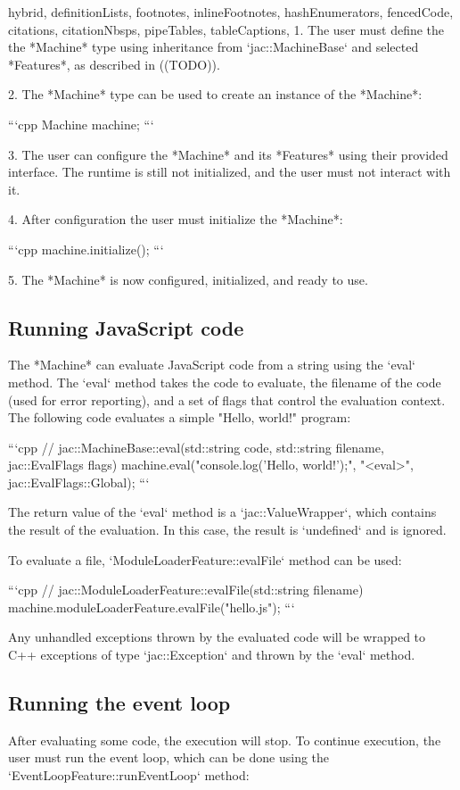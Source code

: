\documentclass[
  digital,
  oneside,
  nosansbold,
  nocolorbold,
  lof,
  lot
]{fithesis4}
\begin{document}
\begin{markdown*}{%
  hybrid,
  definitionLists,
  footnotes,
  inlineFootnotes,
  hashEnumerators,
  fencedCode,
  citations,
  citationNbsps,
  pipeTables,
  tableCaptions,
}
 1. The user must define the the *Machine* type using inheritance from `jac::MachineBase` and selected *Features*, as described in ((TODO)).

 2. The *Machine* type can be used to create an instance of the *Machine*:

```cpp
Machine machine;
```

 3. The user can configure the *Machine* and its *Features* using their provided interface. The runtime is still not initialized, and the user must not interact with it.

 4. After configuration the user must initialize the *Machine*:

```cpp
machine.initialize();
```

 5. The *Machine* is now configured, initialized, and ready to use.

\subsection{Running JavaScript code}

The *Machine* can evaluate JavaScript code from a string using the `eval` method. The `eval` method takes the code to evaluate, the filename of the code (used for error reporting), and a set of flags that control the evaluation context. The following code evaluates a simple "Hello, world!" program:

```cpp
// jac::MachineBase::eval(std::string code, std::string filename, jac::EvalFlags flags)
machine.eval("console.log('Hello, world!');", "<eval>", jac::EvalFlags::Global);
```

The return value of the `eval` method is a `jac::ValueWrapper`, which contains the result of the evaluation. In this case, the result is `undefined` and is ignored.

To evaluate a file, `ModuleLoaderFeature::evalFile` method can be used:

```cpp
// jac::ModuleLoaderFeature::evalFile(std::string filename)
machine.moduleLoaderFeature.evalFile("hello.js");
```

Any unhandled exceptions thrown by the evaluated code will be wrapped to C++ exceptions of type `jac::Exception` and thrown by the `eval` method.

\subsection{Running the event loop}

After evaluating some code, the execution will stop. To continue execution, the user must run the event loop, which can be done using the `EventLoopFeature::runEventLoop` method:


\end{markdown*}
\end{document}

